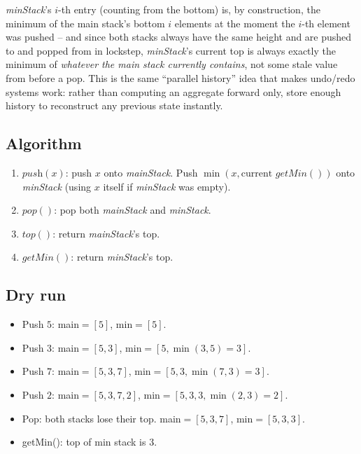 \textit{minStack}'s $i$-th entry (counting from the bottom) is, by
construction, the minimum of the main stack's bottom $i$ elements at the
moment the $i$-th element was pushed -- and since both stacks always have
the same height and are pushed to and popped from in lockstep,
\textit{minStack}'s current top is always exactly the minimum of
\emph{whatever the main stack currently contains}, not some stale value
from before a pop. This is the same ``parallel history'' idea that makes
undo/redo systems work: rather than computing an aggregate forward only,
store enough history to reconstruct any previous state instantly.

\subsection*{Algorithm}

\begin{enumerate}
  \item $\textit{push}(x)$: push $x$ onto \textit{mainStack}. Push
        $\min(x, \text{current } \textit{getMin}())$ onto
        \textit{minStack} (using $x$ itself if \textit{minStack} was
        empty).
  \item $\textit{pop}()$: pop both \textit{mainStack} and
        \textit{minStack}.
  \item $\textit{top}()$: return \textit{mainStack}'s top.
  \item $\textit{getMin}()$: return \textit{minStack}'s top.
\end{enumerate}

\subsection*{Dry run}


\begin{itemize}
  \item Push $5$: main$=[5]$, min$=[5]$.
  \item Push $3$: main$=[5,3]$, min$=[5,\min(3,5){=}3]$.
  \item Push $7$: main$=[5,3,7]$, min$=[5,3,\min(7,3){=}3]$.
  \item Push $2$: main$=[5,3,7,2]$, min$=[5,3,3,\min(2,3){=}2]$.
  \item Pop: both stacks lose their top. main$=[5,3,7]$, min$=[5,3,3]$.
  \item getMin(): top of min stack is $3$.
\end{itemize}

